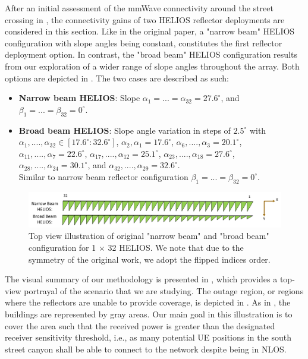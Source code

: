 After an initial assessment of the mmWave connectivity around the street crossing in , the connectivity gains of two HELIOS reflector deployments are considered in this section. Like in the original paper, a "narrow beam" HELIOS configuration with slope angles being constant, constitutes the first reflector deployment option. In contrast, the "broad beam" HELIOS configuration results from our exploration of a wider range of slope angles throughout the array. Both options are depicted in . The two cases are described as such:
\begin{itemize}
	\item \textbf{Narrow beam HELIOS}: Slope $\alpha_{1}=...=\alpha_{32}=\num{27.6}^\circ$, and $\beta_{1}=...=\beta_{32}=0^\circ$.
	\item \textbf{Broad beam HELIOS}: Slope angle variation in steps of $\num{2.5}^\circ$ with $\alpha_{1},....,\alpha_{32} \in [17.6^\circ:32.6^\circ]$, $\alpha_{2}, \alpha_{1}= \num{17.6}^\circ$, $\alpha_{6}, ...., \alpha_{3}=  \num{20.1}^\circ$, $\alpha_{11}, ...., \alpha_{7}= \num{22.6}^\circ$, $\alpha_{17}, ...., \alpha_{12}= \num{25.1}^\circ$, $\alpha_{23}, ...., \alpha_{18}= \num{27.6}^\circ$, $\alpha_{28}, ...., \alpha_{24}= \num{30.1}^\circ$, and $\alpha_{32}, ...., \alpha_{29}= \num{32.6}^\circ$.\\
	 Similar to narrow beam reflector configuration $\beta_{1}= ...= \beta_{32}=0^\circ$.
\end{itemize}
\begin{figure}[tb]
	\centering
	\includegraphics[width=1.0\linewidth]{images/Section 4 Images/beams}
	\caption{Top view illustration of original "narrow beam" and "broad beam" configuration for \num{1} $\times$ \num{32} HELIOS. We note that due to the symmetry of the original work, we adopt the flipped indices order.}
	\label{fig:beams}
\end{figure}
The visual summary of our methodology is presented in , which provides a top-view portrayal of the scenario that we are studying. The outage region, or regions where the reflectors are unable to provide coverage, is depicted in . As in , the buildings are represented by gray areas. Our main goal in this illustration is to cover the area such that the received power is greater than the designated receiver sensitivity threshold, i.e., as many potential UE positions in the south street canyon shall be able to connect to the network despite being in NLOS.

